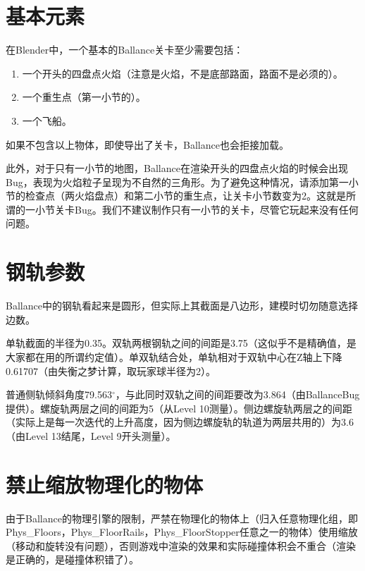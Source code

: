 
\section{基本元素}

在Blender中，一个基本的Ballance关卡至少需要包括：

\begin{enumerate}

\item 一个开头的四盘点火焰（注意是火焰，不是底部路面，路面不是必须的）。

\item 一个重生点（第一小节的）。

\item 一个飞船。

\end{enumerate}

如果不包含以上物体，即使导出了关卡，Ballance也会拒接加载。

此外，对于只有一小节的地图，Ballance在渲染开头的四盘点火焰的时候会出现Bug，表现为火焰粒子呈现为不自然的三角形。为了避免这种情况，请添加第一小节的检查点（两火焰盘点）和第二小节的重生点，让关卡小节数变为2。这就是所谓的一小节关卡Bug。我们不建议制作只有一小节的关卡，尽管它玩起来没有任何问题。

\section{钢轨参数}

Ballance中的钢轨看起来是圆形，但实际上其截面是八边形，建模时切勿随意选择边数。

单轨截面的半径为0.35。双轨两根钢轨之间的间距是3.75（这似乎不是精确值，是大家都在用的所谓约定值）。单双轨结合处，单轨相对于双轨中心在Z轴上下降0.61707（由失衡之梦计算，取玩家球半径为2）。

普通侧轨倾斜角度79.563$^\circ$，与此同时双轨之间的间距要改为3.864（由BallanceBug提供）。螺旋轨两层之间的间距为5（从Level 10测量）。侧边螺旋轨两层之的间距（实际上是每一次迭代的上升高度，因为侧边螺旋轨的轨道为两层共用的）为3.6（由Level 13结尾，Level 9开头测量）。

\section{禁止缩放物理化的物体}

由于Ballance的物理引擎的限制，严禁在物理化的物体上（归入任意物理化组，即Phys\_Floors，Phys\_FloorRails，Phys\_FloorStopper任意之一的物体）使用缩放（移动和旋转没有问题），否则游戏中渲染的效果和实际碰撞体积会不重合（渲染是正确的，是碰撞体积错了）。

